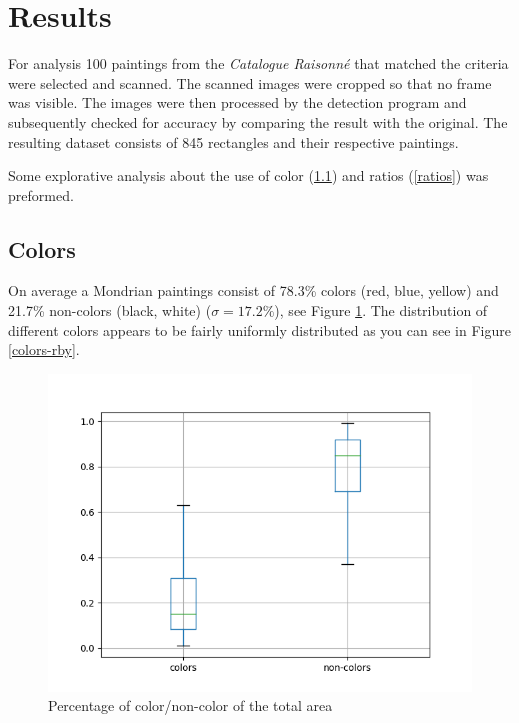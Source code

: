 \section{Results} \label{results}

For analysis 100 paintings from the \textit{Catalogue Raisonn{\'e}}
\cite{joosten1998} that matched the criteria were selected and scanned. The
scanned images were cropped so that no frame was visible. The images were then
processed by the detection program and subsequently checked for accuracy by
comparing the result with the original. The resulting dataset consists of 845
rectangles and their respective paintings.

Some explorative analysis about the use of color (\ref{color}) and ratios
(\ref{ratios}) was preformed.

\subsection{Colors} \label{color}

On average a Mondrian paintings consist of 78.3\% colors (red, blue, yellow) and
21.7\% non-colors (black, white) ($\sigma = 17.2\%$), see Figure
\ref{fig:colors-noncolors}. The distribution of different colors appears to be
fairly uniformly distributed as you can see in Figure \ref{colors-rby}.

\begin{figure}
  \includegraphics[width=\linewidth]{images/colors-non-colors.png}
  \caption{Percentage of color/non-color of the total area}
  \label{fig:colors-noncolors}
\end{figure}

